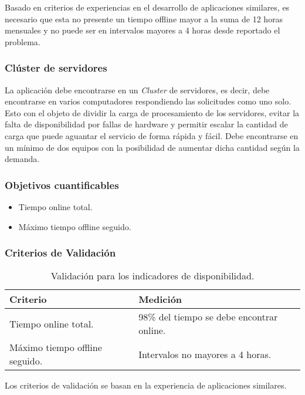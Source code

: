 Basado en criterios de experiencias en el desarrollo de aplicaciones similares, es necesario que esta no presente un tiempo offline mayor a la suma de 12 horas mensuales y no puede ser en intervalos mayores a 4 horas desde reportado el problema.

\subsubsection{Clúster de servidores}

La aplicación debe encontrarse en un \emph{Cluster} de servidores, es decir, debe encontrarse en varios computadores respondiendo las solicitudes como uno solo. Esto con el objeto de dividir la carga de procesamiento de los servidores, evitar la falta de disponibilidad por fallas de hardware y permitir escalar la cantidad de carga que puede aguantar el servicio de forma rápida y fácil. Debe encontrarse en un mínimo de dos equipos con la posibilidad de aumentar dicha cantidad según la demanda.

\subsubsection{Objetivos cuantificables}

\begin{itemize}
	\item
	Tiempo online total.
	\item
	Máximo tiempo offline seguido.
\end{itemize}

\subsubsection{Criterios de Validación}

\begin{table}[H]
    \caption[Validación para los indicadores de disponibilidad.] {Validación para los indicadores de disponibilidad.}
    \label{tbl:Criterios de Validación disponibilidad}
    \begin{tabular}{|p{}|p{}|}
        \hline
        \textbf{Criterio} &  \textbf{Medición}\\
    	\hline
    	\hline
    	Tiempo online total.  & 98\% del tiempo se debe encontrar online.  \\ \hline
    	Máximo tiempo offline seguido.  & Intervalos no mayores a 4 horas.  \\ \hline
    \end{tabular}
\end{table}
Los criterios de validación se basan en la experiencia de aplicaciones similares.

